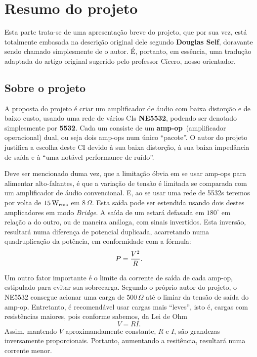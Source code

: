 \documentclass[12pt, a4paper, leqno, twoside]{book}
\def\ohm{\,\Omega}
\def\ampop{amp-op}
\begin{document}
  \chapter{Resumo do projeto}
  Esta parte trata-se de uma apresenta\c c\~ao breve do projeto, que por sua vez, est\'a totalmente embasada na descri\c c\~ao original dele segundo {\bf Douglas Self}, doravante sendo chamado simplesmente de o autor. É, portanto, em ess\^encia, uma tradu\c c\~ao adaptada do artigo original \cite{SelfElektor} sugerido pelo professor C\'icero, nosso orientador. 

  \section{Sobre o projeto} 

  A proposta do projeto \'e criar um amplificador de \'audio com baixa distor\c c\~ao e de baixo custo, usando uma rede de v\'arios CIs {\bf NE5532}, podendo ser denotado simplesmente por {\bf 5532}. Cada um consiste de um {\bf \ampop}\ (amplificador operacional) dual, ou seja dois \ampop{s} num \'unico ``pacote''.  O autor do projeto justifica a escolha deste CI devido \`a sua baixa distor\c c\~ao, \`a sua baixa imped\^ancia de sa\'ida e \`a ``uma not\'avel performance de ru\'ido''. 

  Deve ser mencionado duma vez, que a limita\c c\~ao \'obvia em se usar \ampop s para alimentar alto-falantes, \'e que a varia\c c\~ao de tens\~ao \'e limitada se comparada com um amplificador de \'audio convencional. E, ao se usar uma rede de 5532s teremos por volta de $15\,\rm W_{rms}$ em $8\ohm$. Esta sa\'ida pode ser estendida usando dois destes amplicadores em modo {\it Bridge}. A sa\'ida de um estar\'a defasada em $180^\circ$ em rela\c c\~ao a do outro, ou de maneira an\'aloga, com sinais invertidos. Esta inversão, resultar\'a numa diferen\c ca de potencial duplicada, acarretando numa quadruplica\c c\~ao da pot\^encia, em conformidade com a f\'ormula:
  $$
    P={V^2\over R}.
  $$

  Um outro fator importante \'e o limite da corrente de sa\'ida de cada \ampop, estipulado para evitar sua sobrecarga. Segundo o pr\'oprio autor do projeto, o NE5532 consegue acionar uma carga de $500\ohm$ at\'e o limiar da tens\~ao de sa\'ida do \ampop. Entretanto, \'e recomend\'avel usar cargas mais ``leves'', isto \'e, cargas com resist\^encias maiores, pois conforme sabemos, da Lei de Ohm 
  $$
    V=RI.
  $$
  Assim, mantendo $V$ aproximandamente constante, $R$ e $I$, s\~ao grandezas inversamente proporcionais. Portanto, aumentando a resit\^encia, resultar\'a numa corrente menor. 
\end{document}
